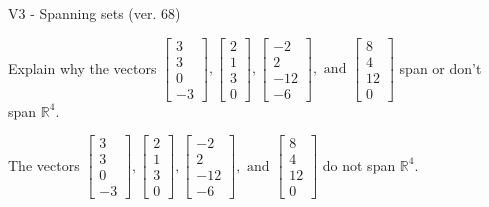 \begin{exercise}
  \begin{exerciseTitle}V3 - Spanning sets (ver. 68)\end{exerciseTitle}
  \begin{exerciseStatement}
    Explain why the vectors \(\left[\begin{array}{r}
3 \\
3 \\
0 \\
-3
\end{array}\right] , \left[\begin{array}{r}
2 \\
1 \\
3 \\
0
\end{array}\right] , \left[\begin{array}{r}
-2 \\
2 \\
-12 \\
-6
\end{array}\right] , \text{ and } \left[\begin{array}{r}
8 \\
4 \\
12 \\
0
\end{array}\right]\) span or don't span \(\mathbb{R}^4\). 
	


  \end{exerciseStatement}
  \begin{exerciseAnswer}
   The vectors \(\left[\begin{array}{r}
3 \\
3 \\
0 \\
-3
\end{array}\right] , \left[\begin{array}{r}
2 \\
1 \\
3 \\
0
\end{array}\right] , \left[\begin{array}{r}
-2 \\
2 \\
-12 \\
-6
\end{array}\right] , \text{ and } \left[\begin{array}{r}
8 \\
4 \\
12 \\
0
\end{array}\right]\) 
  	 do not  
	span \(\mathbb{R}^4\).
  


  \end{exerciseAnswer}
\end{exercise}